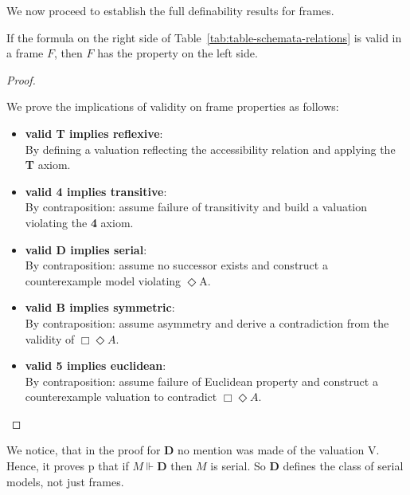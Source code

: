 We now proceed to establish the full definability results for frames.

\begin{theorem}
  \label{thm:definability}
  \leanok
  
  If the formula on the right side of Table~\ref{tab:table-schemata-relations} is valid in a frame $F$, 
  then $F$ has the property on the left side.
\end{theorem}

\begin{proof} 
  \label{proof:definability}
  \leanok

  We prove the implications of validity on frame properties as follows:
  \begin{itemize}
    \item \textbf{valid T implies reflexive}: \\
    By defining a valuation reflecting the accessibility relation and applying the \textbf{T} axiom.

    \item \textbf{valid 4 implies transitive}: \\
    By contraposition: assume failure of transitivity and build a valuation violating the \textbf{4} axiom.

    \item \textbf{valid D implies serial}: \\
    By contraposition: assume no successor exists and construct a counterexample model violating \(\Diamond\)A.

   \item \textbf{valid B implies symmetric}: \\
    By contraposition: assume asymmetry and derive a contradiction from the validity of \(\Box\Diamond A\).

    \item \textbf{valid 5 implies euclidean}: \\
    By contraposition: assume failure of Euclidean property and construct a counterexample valuation to contradict \(\Box \Diamond A\).
  \end{itemize}
\end{proof}

We notice, that in the proof for \textbf{D} no mention was made of the valuation V. Hence, it proves p
that if \( M \Vdash \textbf{D} \) then \( M \) is serial. So \textbf{D} defines the class of serial models, not just frames.

